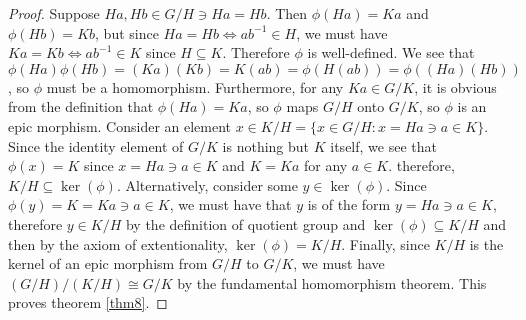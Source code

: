 \documentclass[12pt]{article}
\begin{document}
\begin{proof}
	Suppose $Ha, Hb \in G/H \ni Ha = Hb$.
	Then $\phi(Ha) = Ka$ and $\phi(Hb) = Kb$,
	but since $Ha = Hb \iff ab^{-1} \in H$,
	we must have $Ka = Kb \iff ab^{-1} \in K$
	since $H \subseteq K$.
	Therefore $\phi$ is well-defined.
	We see that $\phi(Ha)\phi(Hb) = (Ka)(Kb) = K(ab) = \phi(H(ab)) = \phi((Ha)(Hb))$,
	so $\phi$ must be a homomorphism.
	Furthermore, for any $Ka \in G/K$, it is obvious from the definition that $\phi(Ha) = Ka$,
	so $\phi$ maps $G/H$ onto $G/K$, so $\phi$ is an epic morphism.
	Consider an element $x \in K/H = \{x \in G/H: x = Ha \ni a \in K\}$.
	Since the identity element of $G/K$ is nothing but $K$ itself,
	we see that $\phi(x) = K$ since $x = Ha \ni a \in K$ and $K = Ka$ for any $a \in K$.
	therefore, $K/H \subseteq \ker(\phi)$.
	Alternatively, consider some $y \in \ker(\phi)$.
	Since $\phi(y) = K = Ka \ni a \in K$,
	we must have that $y$ is of the form $y = Ha \ni a \in K$,
	therefore $y \in K/H$ by the definition of quotient group
	and $\ker(\phi) \subseteq K/H$ and then by the axiom of extentionality,
	$\ker(\phi) = K/H$.
	Finally, since $K/H$ is the kernel of an epic morphism from $G/H$
	to $G/K$, we must have $(G/H)/(K/H) \cong G/K$
	by the fundamental homomorphism theorem.
	This proves theorem \ref{thm8}.
\end{proof}
\end{document}
